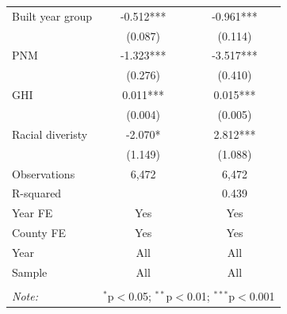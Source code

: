 \documentclass[11pt,twoside,letterpaper]{article}
\begin{document}
\begin{table}[H]
{\begin{tabular}{lcc}
Built year group & -0.512*** & -0.961*** \\
 & (0.087) & (0.114) \\
PNM & -1.323*** & -3.517*** \\
 & (0.276) & (0.410) \\
GHI & 0.011*** & 0.015*** \\
 & (0.004) & (0.005) \\
Racial diveristy & -2.070* & 2.812*** \\
 & (1.149) & (1.088) \\
\hline
Observations & 6,472 & 6,472 \\
R-squared & & 0.439 \\
Year FE & Yes & Yes \\
County FE & Yes & Yes \\
Year & All & All \\
Sample & All & All \\
\hline
\hline \\[-1.8ex]
\textit{Note:} & \multicolumn{2}{r}{$^{*}$p$<$0.05; $^{**}$p$<$0.01; $^{***}$p$<$0.001} \\
\end{tabular}}
\end{table}
\end{document}
